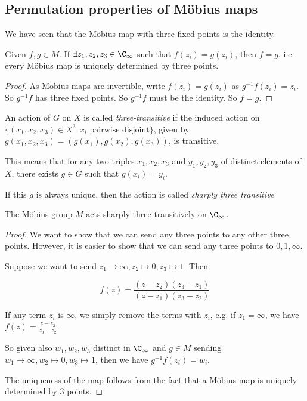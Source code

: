 \documentclass[a4pape]{article}
\begin{document}
\subsection{Permutation properties of M\"obius maps}
We have seen that the M\"obius map with three fixed points is the identity.

\begin{prop}
  Given $f, g\in M$. If $\exists z_1, z_2, z_3\in \C_{\infty}$ such that $f(z_i) = g(z_i)$, then $f = g$. i.e. every M\"obius map is uniquely determined by three points. 
\end{prop}

\begin{proof}
  As M\"obius maps are invertible, write $f(z_i) = g(z_i)$ as $g^{-1}f(z_i) = z_i$. So $g^{-1}f$ has three fixed points. So $g^{-1}f$ must be the identity. So $f = g$.
\end{proof}

\begin{defi}
  An action of $G$ on $X$ is called \emph{three-transitive} if the induced action on $\{(x_1, x_2, x_3)\in X^3: x_i\text{ pairwise disjoint}\}$, given by $g(x_1, x_2, x_3) = (g(x_1), g(x_2), g(x_3))$, is transitive.

This means that for any two triples $x_1, x_2, x_3$ and $y_1, y_2, y_3$ of distinct elements of $X$, there exists $g\in G$ such that $g(x_i) = y_i$.

If this $g$ is always unique, then the action is called \emph{sharply three transitive}
\end{defi}

\begin{prop}
  The M\"obius group $M$ acts sharply three-transitively on $\C_\infty$.
\end{prop}

\begin{proof}
  We want to show that we can send any three points to any other three points. However, it is easier to show that we can send any three points to $0, 1, \infty$. 

Suppose we want to send $z_1\to \infty, z_2\mapsto 0, z_3 \mapsto 1$. Then

\[
f(z) = \frac{(z - z_2)(z_3 - z_1)}{(z - z_1)(z_3 - z_2)}
\]

If any term $z_i$ is $\infty$, we simply remove the terms with $z_i$, e.g. if $z_1 = \infty$, we have $f(z) = \frac{z - z_2}{z_3 - z_2}$.

So given also $w_1, w_2, w_3$ distinct in $\C_\infty$ and $g\in M$ sending $w_1\mapsto \infty, w_2\mapsto 0, w_3\mapsto 1$, then we have $g^{-1}f(z_i) = w_i$.

The uniqueness of the map follows from the fact that a M\"obius map is uniquely determined by 3 points.
\end{proof}
\end{document}
